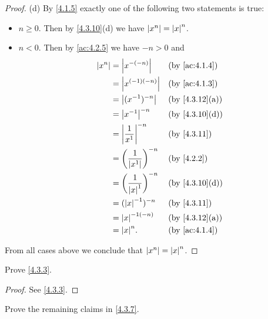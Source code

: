 \begin{proof}{(d)}
  By \cref{4.1.5} exactly one of the following two statements is true:
  \begin{itemize}
    \item \(n \geq 0\).
          Then by \cref{4.3.10}(d) we have \(\left\lvert x^n\right\rvert = \left\lvert x\right\rvert^n\).
    \item \(n < 0\).
          Then by \cref{ac:4.2.5} we have \(-n > 0\) and
          \begin{align*}
            \abs{x^n} & = \abs{x^{-(-n)}}                       &  & \text{(by \cref{ac:4.1.4})}  \\
                      & = \abs{x^{(-1)(-n)}}                    &  & \text{(by \cref{ac:4.1.3})}  \\
                      & = \abs{(x^{-1})^{-n}}                   &  & \text{(by \cref{4.3.12}(a))} \\
                      & = \abs{x^{-1}}^{-n}                     &  & \text{(by \cref{4.3.10}(d))} \\
                      & = \abs{\dfrac{1}{x^1}}^{-n}             &  & \text{(by \cref{4.3.11})}    \\
                      & = \bigg(\dfrac{1}{\abs{x^1}}\bigg)^{-n} &  & \by{4.2.2}                   \\
                      & = \bigg(\dfrac{1}{\abs{x}^1}\bigg)^{-n} &  & \text{(by \cref{4.3.10}(d))} \\
                      & = (\abs{x}^{-1})^{-n}                   &  & \text{(by \cref{4.3.11})}    \\
                      & = \abs{x}^{-1(-n)}                      &  & \text{(by \cref{4.3.12}(a))} \\
                      & = \abs{x}^n.                            &  & \text{(by \cref{ac:4.1.4})}
          \end{align*}
  \end{itemize}
  From all cases above we conclude that \(\left\lvert x^n\right\rvert = \left\lvert x\right\rvert^n\).
\end{proof}

\exercisesection

\begin{ex}\label{ex:4.3.1}
  Prove \cref{4.3.3}.
\end{ex}

\begin{proof}
  See \cref{4.3.3}.
\end{proof}

\begin{ex}\label{ex:4.3.2}
  Prove the remaining claims in \cref{4.3.7}.
\end{ex}

